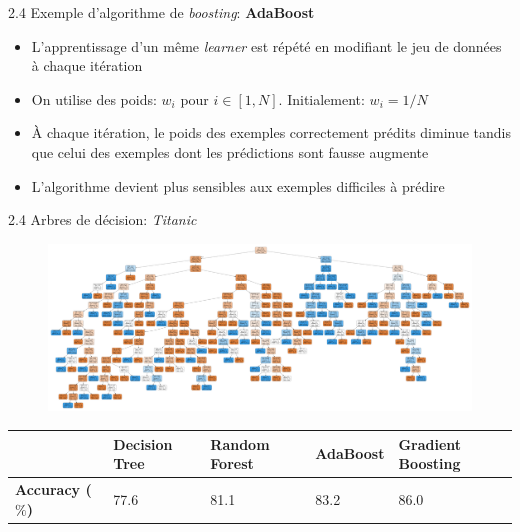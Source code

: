 \begin{frame}{2.4 Exemple d'algorithme de \textit{boosting}: \textbf{AdaBoost}}
  \begin{itemize}
  \item L'apprentissage d'un même \textit{learner} est répété en modifiant le jeu de données à chaque itération
  \item On utilise des poids: $w_{i}$ pour $i \in [1,N]$. Initialement: $w_{i} = 1/N$
  \item À chaque itération, le poids des exemples correctement prédits diminue tandis que celui des exemples dont les prédictions sont fausse augmente
  \item L'algorithme devient plus sensibles aux exemples difficiles à prédire
  \end{itemize}
\end{frame}

\begin{frame}{2.4 Arbres de décision: \textit{Titanic}}
  \begin{figure}
    \includegraphics[width=\textwidth]{notebook/decisionTrees/titanic.pdf}
  \end{figure}
  \begin{table}
    \footnotesize
    \begin{tabular}{l|l|l|l|l}
      & \textbf{Decision Tree}  & \textbf{Random Forest}  & \textbf{AdaBoost}  & \textbf{Gradient Boosting} \\
      \hline
      \textbf{Accuracy (\boldmath $\%$)} & 77.6 & 81.1 & 83.2 & 86.0 \\
    \end{tabular}
  \end{table}
\end{frame}

